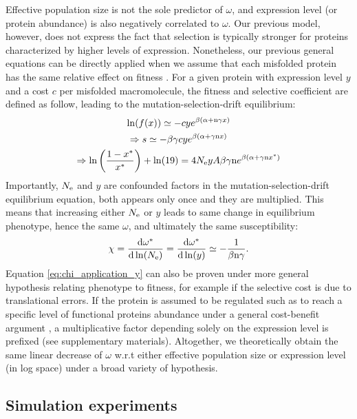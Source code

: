Effective population size is not the sole predictor of $\omega$, and expression level (or protein abundance) is also negatively correlated to $\omega$. 
Our previous model, however, does not express the fact that selection is typically stronger for proteins characterized by higher levels of expression.
Nonetheless, our previous general equations can be directly applied when we assume that each misfolded protein has the same relative effect on fitness \citep{Drummond2005a, Wilke2006, Drummond2008, Serohijos2012}. 
For a given protein with expression level $y$ and a cost $c$ per misfolded macromolecule, the fitness and selective coefficient are defined as follow, leading to the mutation-selection-drift equilibrium:
\begin{gather}
\ln (f(x)) \simeq - c y e^{\beta (\alpha + \text{n} \gamma x)} \\
\Rightarrow s \simeq - \beta \gamma c y e^{\beta(\alpha + \gamma \text{n} x)} \\
\Rightarrow \ln \left( \frac{1 - x^{*}}{x^{*}} \right) + \ln (19) = 4N_{\mathrm{e}} y A \beta \gamma \text{n} e^{\beta(\alpha + \gamma \text{n} x^{*})}
\end{gather}
Importantly, $N_{\mathrm{e}}$ and $y$ are confounded factors in the mutation-selection-drift equilibrium equation, both appears only once and they are multiplied.
This means that increasing either $N_{\mathrm{e}}$ or $y$ leads to same change in equilibrium phenotype, hence the same $\omega$, and ultimately the same susceptibility:
\begin{align}
\chi = \frac{ \der \omega\eq}{\der \ln (\Ne)} = \frac{ \der \omega\eq}{\der \ln (y)} \simeq - \frac{1}{\beta \Nsite \gamma}. \label{eq:chi_application_y}
\end{align}
Equation \ref{eq:chi_application_y} can also be proven under more general hypothesis relating phenotype to fitness, for example if the selective cost is due to translational errors.
If the protein is assumed to be regulated such as to reach a specific level of functional proteins abundance under a general cost-benefit argument \citep{Cherry2010,Gout2010}, a multiplicative factor depending solely on the expression level is prefixed (see supplementary materials).
Altogether, we theoretically obtain the same linear decrease of $\omega$ w.r.t either effective population size or expression level (in log space) under a broad variety of hypothesis.

\subsection{Simulation experiments}

